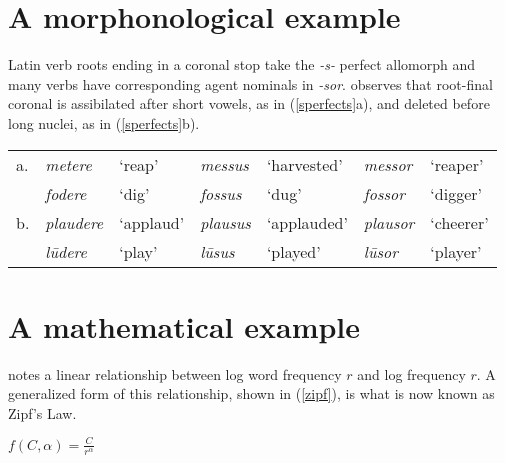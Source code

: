 \documentclass[draft,12pt]{article}
\begin{document}
\section{A morphonological example}

Latin verb roots ending in a coronal stop take the \emph{-s-} perfect allomorph and many verbs have corresponding agent nominals in \emph{-sor}. \citet{Heslin1987} observes that root-final coronal is assibilated after short vowels, as in (\ref{sperfects}a), and deleted before long nuclei, as in (\ref{sperfects}b).

\begin{example} \label{sperfects}
\begin{tabular}{l l l l l l l}
a. & \emph{metere}   & `reap'    & \emph{messus}  & `harvested' & \emph{messor}  & `reaper'   \\
   & \emph{fodere}   & `dig'     & \emph{fossus}  & `dug'       & \emph{fossor}  & `digger'   \\
b. & \emph{plaudere} & `applaud' & \emph{plausus} & `applauded' & \emph{plausor} & `cheerer'  \\
   & \emph{lūdere}   & `play'    & \emph{lūsus}   & `played'    & \emph{lūsor}   & `player' \\
\end{tabular}
\end{example}

\section{A mathematical example}

\citet{Zipf1949} notes a linear relationship between log word frequency $r$ and log frequency $r$. A generalized form of this relationship, shown in (\ref{zipf}), is what is now known as Zipf's Law.

\begin{unlabeledexample} \label{zipf}
$\displaystyle f(C, \alpha) = \frac{C}{r^\alpha}$
\end{unlabeledexample}



\end{document}

